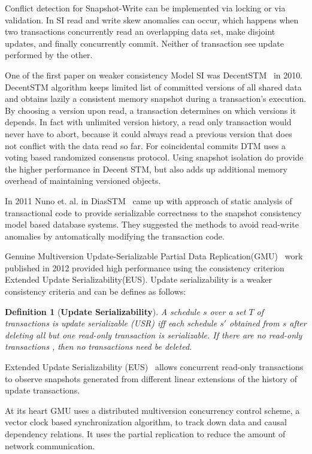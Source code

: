 \documentclass[12pt,english]{report}
\newtheorem{definition}{Definition}[section]
\begin{document}
Conflict detection for Snapshot-Write can be implemented via locking or via validation. In SI read and write skew anomalies can occur, which happens when two transactions concurrently read an overlapping data set, make disjoint updates, and finally concurrently commit. Neither of transaction see update performed by the other.

One of the first paper on weaker consistency Model SI was DecentSTM~\cite{DecentSTM:5470446} in 2010.  DecentSTM algorithm keeps limited list of committed versions of all shared data and obtains lazily a consistent memory snapshot during a transaction’s execution. By choosing a version upon read, a transaction determines on which versions it depends. In fact with unlimited version history, a read only transaction would never have to abort, because it could always read a previous version that does not conflict with the data read so far. For coincidental commits DTM uses a voting based randomized consensus protocol. Using snapshot isolation do provide the higher performance in Decent STM, but also adds up additional memory overhead of maintaining versioned objects.  

In 2011 Nuno et. al. in DiasSTM~\cite{dias2011efficient} came up with approach of static analysis of transactional code to provide serializable correctness to the snapshot consistency model based database systems. They suggested the methods to avoid read-write anomalies by automatically modifying the transaction code.

Genuine Multiversion Update-Serializable Partial Data Replication(GMU)~\cite{GMU:peluso2012scalability} work published in 2012 provided high performance using the consistency criterion Extended Update Serializability(EUS). Update serializability is a weaker consistency criteria and can be defines as follows:

\begin{definition}[\textbf{Update Serializability}]
A schedule $s$ over a set $T$ of transactions is update serializable (USR) iff each schedule $s'$ obtained from $s$ after deleting all but one read-only transaction is serializable. If there are no read-only transactions , then no transactions need be deleted.
\end{definition}

Extended Update Serializability (EUS)~\cite{EUS:HansdahPatnaik} allows concurrent read-only transactions to observe snapshots generated from different linear extensions of the history of update transactions.

At its heart GMU uses a distributed multiversion concurrency control scheme, a vector clock based synchronization algorithm, to track down data and causal dependency relations. It uses the partial replication to reduce the amount of network communication. 
\end{document}
